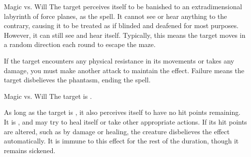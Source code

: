 \begin{spellheader}
    \spellrng{\rngmed}
    \spelldur{\durmed}
\end{spellheader}
\begin{spelleffects}
    \begin{spellattack}{Magic vs. Will}
        \spellsuccess The target perceives itself to be banished to an extradimensional labyrinth of force planes, as the  spell. It cannot see or hear anything to the contrary, causing it to be treated as if blinded and deafened for most purposes. However, it can still see and hear itself. Typically, this means the target moves in a random direction each round to escape the maze.

        If the target encounters any physical resistance in its movements or takes any damage, you must make another attack to maintain the effect. Failure means the target disbelieves the phantasm, ending the spell.
    \end{spellattack}
\end{spelleffects}
\begin{spellfooter}

\end{spellfooter}

\begin{spellheader}
    \spellrng{\rngmed}
    \spelldur{\durshort}
\end{spellheader}
\begin{spelleffects}
    \begin{spellattack}{Magic vs. Will}
        \spellsuccess The target is \sickened.

        As long as the target is \bloodied, it also perceives itself to have no hit points remaining. It is \staggered, and may try to heal itself or take other appropriate actions. If its hit points are altered, such as by damage or healing, the creature disbelieves the effect automatically. It is immune to this effect for the rest of the duration, though it remains sickened.
    \end{spellattack}
\end{spelleffects}
\begin{spellfooter}

\end{spellfooter}

